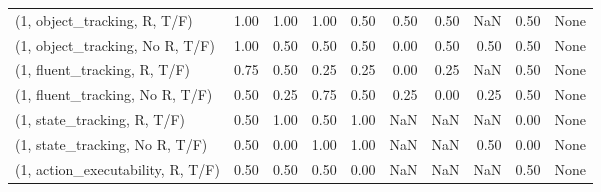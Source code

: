 \begin{table*}[h!]
\begin{adjustbox}{width=2\columnwidth,center}
\begin{tabular}{lrrr|rrr|rrr}
\midrule
(1, object\_tracking, R, T/F)         &                      1.00 &                  1.00 &                      1.00 &                          0.50 &                      0.50 &                          0.50 &                                    NaN &                               0.50 &                                  None \\
(1, object\_tracking, No R, T/F)      &                      1.00 &                  0.50 &                      0.50 &                          0.50 &                      0.00 &                          0.50 &                                   0.50 &                               0.50 &                                  None \\
(1, fluent\_tracking, R, T/F)         &                      0.75 &                  0.50 &                      0.25 &                          0.25 &                      0.00 &                          0.25 &                                    NaN &                               0.50 &                                  None \\
(1, fluent\_tracking, No R, T/F)      &                      0.50 &                  0.25 &                      0.75 &                          0.50 &                      0.25 &                          0.00 &                                   0.25 &                               0.50 &                                  None \\
(1, state\_tracking, R, T/F)          &                      0.50 &                  1.00 &                      0.50 &                          1.00 &                       NaN &                           NaN &                                    NaN &                               0.00 &                                  None \\
(1, state\_tracking, No R, T/F)       &                      0.50 &                  0.00 &                      1.00 &                          1.00 &                       NaN &                           NaN &                                   0.50 &                               0.00 &                                  None \\
(1, action\_executability, R, T/F)    &                      0.50 &                  0.50 &                      0.50 &                          0.00 &                       NaN &                           NaN &                                    NaN &                               0.50 &                                  None \\

\end{tabular}
\end{adjustbox}
\end{table*}
